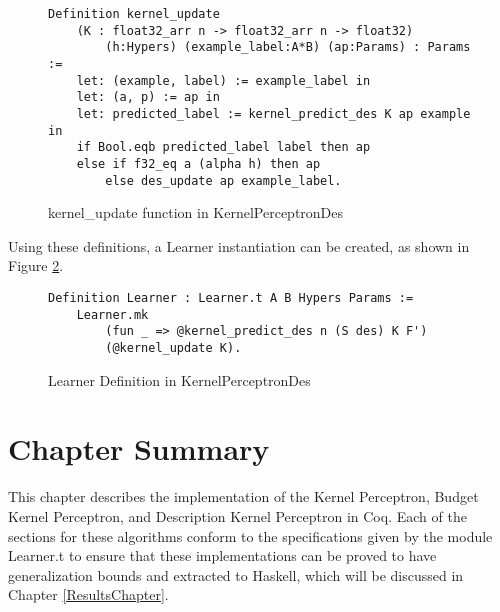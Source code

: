 \begin{figure}
    \caption{kernel\_update function in KernelPerceptronDes}
    \label{kernel_update_desDef}
    \begin{lstlisting}
Definition kernel_update 
    (K : float32_arr n -> float32_arr n -> float32)
        (h:Hypers) (example_label:A*B) (ap:Params) : Params :=
    let: (example, label) := example_label in
    let: (a, p) := ap in 
    let: predicted_label := kernel_predict_des K ap example in
    if Bool.eqb predicted_label label then ap
    else if f32_eq a (alpha h) then ap
        else des_update ap example_label.
    \end{lstlisting}
\end{figure}

Using these definitions, a Learner instantiation can be created, as shown in Figure \ref{kpdLearnerDef}.

\begin{figure}
    \caption{Learner Definition in KernelPerceptronDes}
    \label{kpdLearnerDef}
    \begin{lstlisting}
Definition Learner : Learner.t A B Hypers Params :=
    Learner.mk
        (fun _ => @kernel_predict_des n (S des) K F')
        (@kernel_update K).
    \end{lstlisting}
\end{figure}

\section{Chapter Summary}\label{MethodsChapterSummarySection}
This chapter describes the implementation of the Kernel Perceptron, Budget Kernel Perceptron, and Description Kernel Perceptron in Coq. Each of the sections for these algorithms conform to the specifications given by the module Learner.t to ensure that these implementations can be proved to have generalization bounds and extracted to Haskell, which will be discussed in Chapter \ref{ResultsChapter}. 
